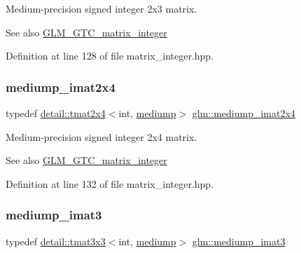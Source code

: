 Medium-\/precision signed integer 2x3 matrix. \begin{DoxySeeAlso}{See also}
\hyperlink{group__gtc__matrix__integer}{G\+L\+M\+\_\+\+G\+T\+C\+\_\+matrix\+\_\+integer} 
\end{DoxySeeAlso}


Definition at line 128 of file matrix\+\_\+integer.\+hpp.

\mbox{\label{group__gtc__matrix__integer_ga90b020de8489a1d4424c0ffcc17c83dd}} 
\subsubsection{\texorpdfstring{mediump\+\_\+imat2x4}{mediump\_imat2x4}}
{\footnotesize\ttfamily typedef \hyperlink{structglm_1_1detail_1_1tmat2x4}{detail\+::tmat2x4}$<$int, \hyperlink{namespaceglm_a0f04f086094c747d227af4425893f545a6416f3ea0c9025fb21ed50c4d6620482}{mediump}$>$ \hyperlink{group__gtc__matrix__integer_ga90b020de8489a1d4424c0ffcc17c83dd}{glm\+::mediump\+\_\+imat2x4}}

Medium-\/precision signed integer 2x4 matrix. \begin{DoxySeeAlso}{See also}
\hyperlink{group__gtc__matrix__integer}{G\+L\+M\+\_\+\+G\+T\+C\+\_\+matrix\+\_\+integer} 
\end{DoxySeeAlso}


Definition at line 132 of file matrix\+\_\+integer.\+hpp.

\mbox{\label{group__gtc__matrix__integer_ga6b438ab863af0122b532adc93b89105e}} 
\subsubsection{\texorpdfstring{mediump\+\_\+imat3}{mediump\_imat3}}
{\footnotesize\ttfamily typedef \hyperlink{structglm_1_1detail_1_1tmat3x3}{detail\+::tmat3x3}$<$int, \hyperlink{namespaceglm_a0f04f086094c747d227af4425893f545a6416f3ea0c9025fb21ed50c4d6620482}{mediump}$>$ \hyperlink{group__gtc__matrix__integer_ga6b438ab863af0122b532adc93b89105e}{glm\+::mediump\+\_\+imat3}}

